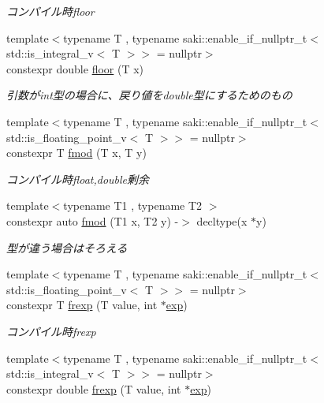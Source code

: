 \begin{DoxyCompactItemize}
\begin{DoxyCompactList}\small\item\em コンパイル時floor \end{DoxyCompactList}\item 
{\footnotesize template$<$typename T , typename saki\+::enable\+\_\+if\+\_\+nullptr\+\_\+t$<$ std\+::is\+\_\+integral\+\_\+v$<$ T $>$$>$  = nullptr$>$ }\\constexpr double \mbox{\hyperlink{namespacesaki_a327cd6800fef212948644f69cb31d4ff}{floor}} (T x)
\begin{DoxyCompactList}\small\item\em 引数がint型の場合に、戻り値をdouble型にするためのもの \end{DoxyCompactList}\item 
{\footnotesize template$<$typename T , typename saki\+::enable\+\_\+if\+\_\+nullptr\+\_\+t$<$ std\+::is\+\_\+floating\+\_\+point\+\_\+v$<$ T $>$$>$  = nullptr$>$ }\\constexpr T \mbox{\hyperlink{namespacesaki_a8a7b926b9d370e4a9aed84579675222c}{fmod}} (T x, T y)
\begin{DoxyCompactList}\small\item\em コンパイル時float,double剰余 \end{DoxyCompactList}\item 
{\footnotesize template$<$typename T1 , typename T2 $>$ }\\constexpr auto \mbox{\hyperlink{namespacesaki_ac9d00b62957aebad23850e2f470a8d9c}{fmod}} (T1 x, T2 y) -\/$>$ decltype(x $\ast$y)
\begin{DoxyCompactList}\small\item\em 型が違う場合はそろえる \end{DoxyCompactList}\item 
{\footnotesize template$<$typename T , typename saki\+::enable\+\_\+if\+\_\+nullptr\+\_\+t$<$ std\+::is\+\_\+floating\+\_\+point\+\_\+v$<$ T $>$$>$  = nullptr$>$ }\\constexpr T \mbox{\hyperlink{namespacesaki_a00438d1cd099cfd0e2938f9e3defd283}{frexp}} (T value, int $\ast$\mbox{\hyperlink{namespacesaki_abc1268e543a60d43b04f1418f5ef3e41}{exp}})
\begin{DoxyCompactList}\small\item\em コンパイル時frexp \end{DoxyCompactList}\item 
{\footnotesize template$<$typename T , typename saki\+::enable\+\_\+if\+\_\+nullptr\+\_\+t$<$ std\+::is\+\_\+integral\+\_\+v$<$ T $>$$>$  = nullptr$>$ }\\constexpr double \mbox{\hyperlink{namespacesaki_a915bdd850c89e1ed06c5087790109f11}{frexp}} (T value, int $\ast$\mbox{\hyperlink{namespacesaki_abc1268e543a60d43b04f1418f5ef3e41}{exp}})

\end{DoxyCompactItemize}
